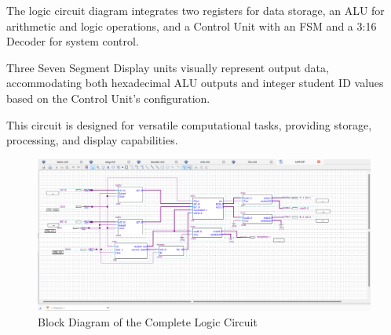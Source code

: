 
{The logic circuit diagram integrates two registers for data storage, an ALU for arithmetic and logic operations, and a Control Unit with an FSM and a 3:16 Decoder for system control.}

{Three Seven Segment Display units visually represent output data, accommodating both hexadecimal ALU outputs and integer student ID values based on the Control Unit's configuration.}

{This circuit is designed for versatile computational tasks, providing storage, processing, and display capabilities.}

\begin{figure}[H]
    \centering
    \includegraphics[width=16cm]{Pictures/BlockDiagram.png}
    \caption{{Block Diagram of the Complete Logic Circuit}}
    \label{FSM}
\end{figure}
